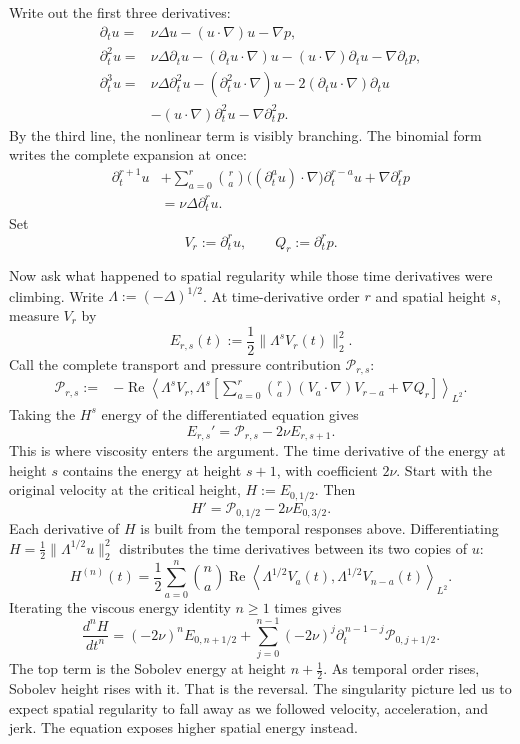 \documentclass[12pt]{article}
\begin{document}
Write out the first three derivatives:
\[
\begin{aligned}
  \partial_tu
  ={}&
  \nu\Delta u
  -(u\cdot\nabla)u
  -\nabla p,
  \\
  \partial_t^2u
  ={}&
  \nu\Delta\partial_tu
  -(\partial_tu\cdot\nabla)u
  -(u\cdot\nabla)\partial_tu
  -\nabla\partial_tp,
  \\
  \partial_t^3u
  ={}&
  \nu\Delta\partial_t^2u
  -(\partial_t^2u\cdot\nabla)u
  -2(\partial_tu\cdot\nabla)\partial_tu
  \\
  &
  -(u\cdot\nabla)\partial_t^2u
  -\nabla\partial_t^2p.
\end{aligned}
\]
By the third line, the nonlinear term is visibly branching. The binomial form
writes the complete expansion at once:
\[
\begin{aligned}
  \partial_t^{r+1}u
  &+
  \sum_{a=0}^{r}\binom{r}{a}
  \bigl((\partial_t^au)\cdot\nabla\bigr)\partial_t^{r-a}u
  +
  \nabla\partial_t^rp
  \\
  &=
  \nu\Delta\partial_t^ru.
\end{aligned}
\]
Set
\[
  V_r:=\partial_t^ru,
  \qquad
  Q_r:=\partial_t^rp.
\]

Now ask what happened to spatial regularity while those time derivatives were
climbing. Write \(\Lambda:=(-\Delta)^{1/2}\). At time-derivative order \(r\)
and spatial height \(s\), measure \(V_r\) by
\[
  E_{r,s}(t):=\frac12\|\Lambda^sV_r(t)\|_2^2.
\]
Call the complete transport and pressure contribution \(\mathcal P_{r,s}\):
\[
\begin{aligned}
  \mathcal P_{r,s}:={}&
  -\operatorname{Re}
  \left\langle
    \Lambda^sV_r,
    \Lambda^s\!\left[
      \sum_{a=0}^{r}\binom{r}{a}
      (V_a\cdot\nabla)V_{r-a}
      +\nabla Q_r
    \right]
  \right\rangle_{L^2}.
\end{aligned}
\]
Taking the \(H^s\) energy of the differentiated equation gives
\[
  E_{r,s}'=\mathcal P_{r,s}-2\nu E_{r,s+1}.
\]
This is where viscosity enters the argument. The time derivative of the energy
at height \(s\) contains the energy at height \(s+1\), with coefficient
\(2\nu\). Start with the original velocity at the critical height,
\(H:=E_{0,1/2}\). Then
\[
  H'=\mathcal P_{0,1/2}-2\nu E_{0,3/2}.
\]
Each derivative of \(H\) is built from the temporal responses above.
Differentiating \(H=\tfrac12\|\Lambda^{1/2}u\|_2^2\) distributes the time
derivatives between its two copies of \(u\):
\[
  H^{(n)}(t)
  =
  \frac12
  \sum_{a=0}^{n}\binom{n}{a}
  \operatorname{Re}
  \left\langle
    \Lambda^{1/2}V_a(t),
    \Lambda^{1/2}V_{n-a}(t)
  \right\rangle_{L^2}.
\]
Iterating the viscous energy identity \(n\geq1\) times gives
\[
  \frac{d^nH}{dt^n}
  =
  (-2\nu)^nE_{0,n+1/2}
  +
  \sum_{j=0}^{n-1}
  (-2\nu)^j
  \partial_t^{\,n-1-j}\mathcal P_{0,j+1/2}.
\]
The top term is the Sobolev energy at height \(n+\tfrac12\). As temporal order
rises, Sobolev height rises with it. That is the reversal. The singularity
picture led us to expect spatial regularity to fall away as we followed
velocity, acceleration, and jerk. The equation exposes higher spatial energy
instead.
\end{document}
